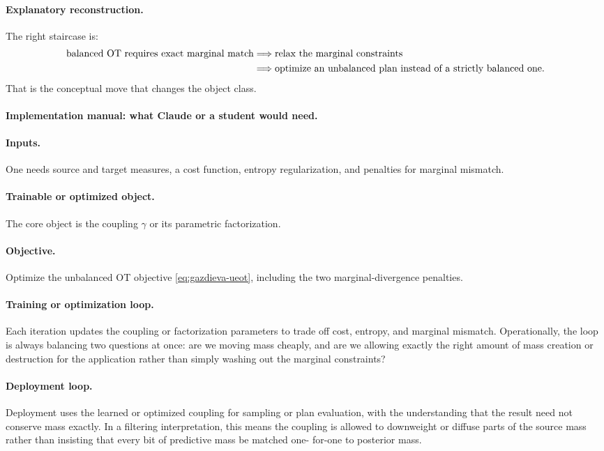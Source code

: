 \documentclass[11pt]{report}
\begin{document}
\paragraph{Explanatory reconstruction.}
The right staircase is:
\begin{align}
\text{balanced OT requires exact marginal match}
&\Longrightarrow
\text{relax the marginal constraints}
\notag\\
&\Longrightarrow
\text{optimize an unbalanced plan instead of a strictly balanced one}.
\label{eq:gazdieva-logic}
\end{align}
That is the conceptual move that changes the object class.

\paragraph{Implementation manual: what Claude or a student would need.}
\paragraph{Inputs.}
One needs source and target measures, a cost function, entropy regularization, and
penalties for marginal mismatch.

\paragraph{Trainable or optimized object.}
The core object is the coupling $\gamma$ or its parametric factorization.

\paragraph{Objective.}
Optimize the unbalanced OT objective \eqref{eq:gazdieva-ueot}, including the two
marginal-divergence penalties.

\paragraph{Training or optimization loop.}
Each iteration updates the coupling or factorization parameters to trade off cost,
entropy, and marginal mismatch.  Operationally, the loop is always balancing two
questions at once: are we moving mass cheaply, and are we allowing exactly the right
amount of mass creation or destruction for the application rather than simply washing
out the marginal constraints?

\paragraph{Deployment loop.}
Deployment uses the learned or optimized coupling for sampling or plan evaluation,
with the understanding that the result need not conserve mass exactly.  In a filtering
interpretation, this means the coupling is allowed to downweight or diffuse parts of
the source mass rather than insisting that every bit of predictive mass be matched one-
for-one to posterior mass.
\end{document}
